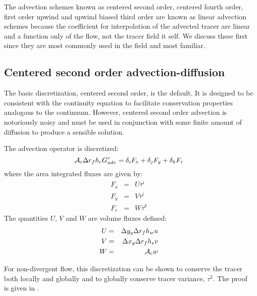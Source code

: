 The advection schemes known as centered second order, centered fourth
order, first order upwind and upwind biased third order are known as
linear advection schemes because the coefficient for interpolation of
the advected tracer are linear and a function only of the flow, not
the tracer field it self. We discuss these first since they are most
commonly used in the field and most familiar.

\subsection{Centered second order advection-diffusion}

The basic discretization, centered second order, is the default. It is
designed to be consistent with the continuity equation to facilitate
conservation properties analogous to the continuum. However, centered
second order advection is notoriously noisy and must be used in
conjunction with some finite amount of diffusion to produce a sensible
solution.

The advection operator is discretized:
\begin{equation}
{\cal A}_c \Delta r_f h_c G_{adv}^\tau = 
\delta_i F_x + \delta_j F_y + \delta_k F_r
\end{equation}
where the area integrated fluxes are given by:
\begin{eqnarray}
F_x & = & U \overline{ \tau }^i \\
F_y & = & V \overline{ \tau }^j \\
F_r & = & W \overline{ \tau }^k
\end{eqnarray}
The quantities $U$, $V$ and $W$ are volume fluxes defined:
\begin{eqnarray}
U & = & \Delta y_g \Delta r_f h_w u \\
V & = & \Delta x_g \Delta r_f h_s v \\
W & = & {\cal A}_c w
\end{eqnarray}

For non-divergent flow, this discretization can be shown to conserve
the tracer both locally and globally and to globally conserve tracer
variance, $\tau^2$. The proof is given in \cite{adcroft:95,adcroft:97}.

